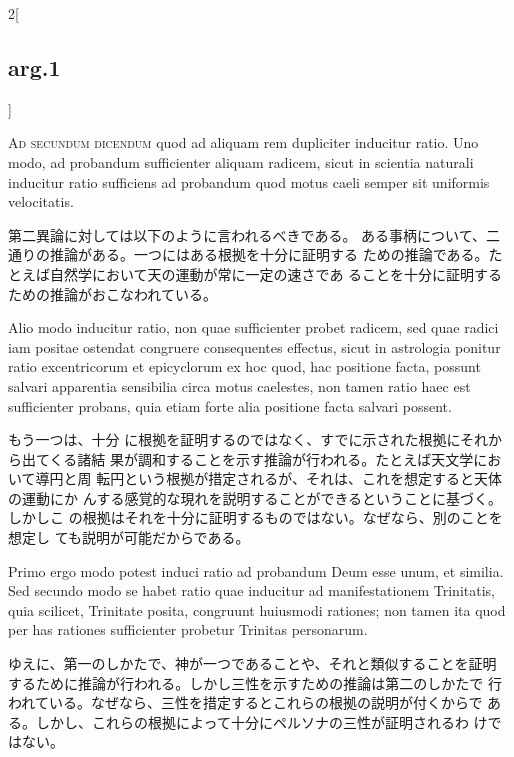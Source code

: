 \documentclass[paper=a4paper,fontsize=10pt,jafontsize=9pt,titlepage]{jlreq}
\begin{document}
\begin{paracol}{2}[\subsection{arg.1}]
\switchcolumn*[\subsection{ad.2}]

{\scshape Ad secundum dicendum} quod ad aliquam rem dupliciter inducitur
ratio. Uno modo, ad probandum sufficienter aliquam radicem, sicut in
scientia naturali inducitur ratio sufficiens ad probandum quod motus
caeli semper sit uniformis velocitatis.

\switchcolumn

第二異論に対しては以下のように言われるべきである。
ある事柄について、二通りの推論がある。一つにはある根拠を十分に証明する
 ための推論である。たとえば自然学において天の運動が常に一定の速さであ
 ることを十分に証明するための推論がおこなわれている。

\switchcolumn*

Alio modo inducitur ratio, non
quae sufficienter probet radicem, sed quae radici iam positae ostendat
congruere consequentes effectus, sicut in astrologia ponitur ratio
excentricorum et epicyclorum ex hoc quod, hac positione facta, possunt
salvari apparentia sensibilia circa motus caelestes, non tamen ratio
haec est sufficienter probans, quia etiam forte alia positione facta
salvari possent.

\switchcolumn

もう一つは、十分
 に根拠を証明するのではなく、すでに示された根拠にそれから出てくる諸結
 果が調和することを示す推論が行われる。たとえば天文学において導円と周
 転円という根拠が措定されるが、それは、これを想定すると天体の運動にか
 んする感覚的な現れを説明することができるということに基づく。しかしこ
 の根拠はそれを十分に証明するものではない。なぜなら、別のことを想定し
 ても説明が可能だからである。

\switchcolumn*

Primo ergo modo potest induci ratio ad probandum Deum
esse unum, et similia. Sed secundo modo se habet ratio quae inducitur
ad manifestationem Trinitatis, quia scilicet, Trinitate posita,
congruunt huiusmodi rationes; non tamen ita quod per has rationes
sufficienter probetur Trinitas personarum.

\switchcolumn

ゆえに、第一のしかたで、神が一つであることや、それと類似することを証明
 するために推論が行われる。しかし三性を示すための推論は第二のしかたで
行われている。なぜなら、三性を措定するとこれらの根拠の説明が付くからで
 ある。しかし、これらの根拠によって十分にペルソナの三性が証明されるわ
 けではない。


\end{paracol}
\end{document}
